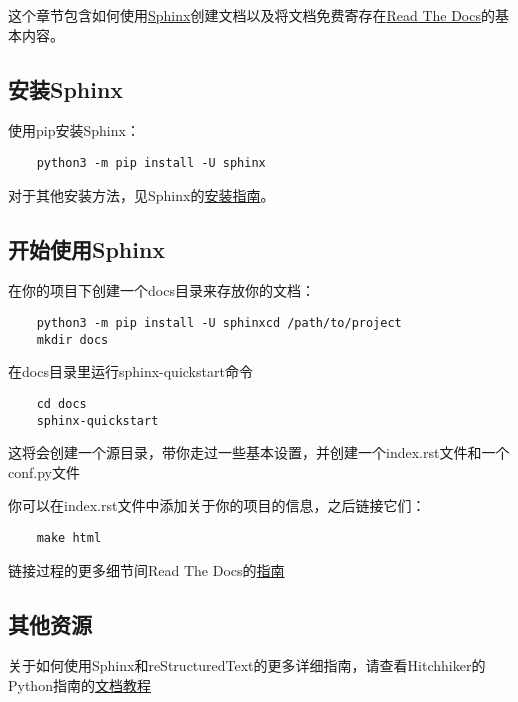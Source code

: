 \documentclass[../package_tutorial.tex]{subfiles}
\begin{document}
这个章节包含如何使用\href{http://sphinx-doc.org/}{Sphinx}创建文档以及将文档免费寄存在\href{https://readthedocs.org/}{Read The Docs}的基本内容。

\subsection{安装Sphinx}

使用pip安装Sphinx：

\begin{lstlisting}
    python3 -m pip install -U sphinx
\end{lstlisting}

对于其他安装方法，见Sphinx的\href{http://www.sphinx-doc.org/en/master/usage/installation.html}{安装指南}。

\subsection{开始使用Sphinx}

在你的项目下创建一个docs目录来存放你的文档：

\begin{lstlisting}
    python3 -m pip install -U sphinxcd /path/to/project
    mkdir docs
\end{lstlisting}

在docs目录里运行sphinx-quickstart命令

\begin{lstlisting}
    cd docs
    sphinx-quickstart
\end{lstlisting}

这将会创建一个源目录，带你走过一些基本设置，并创建一个index.rst文件和一个conf.py文件

你可以在index.rst文件中添加关于你的项目的信息，之后链接它们：

\begin{lstlisting}
    make html
\end{lstlisting}

链接过程的更多细节间Read The Docs的\href{https://docs.readthedocs.io/en/latest/intro/import-guide.html}{指南}

\subsection{其他资源}

关于如何使用Sphinx和reStructuredText的更多详细指南，请查看Hitchhiker的Python指南的\href{https://docs.python-guide.org/writing/documentation/}{文档教程}
\end{document}
